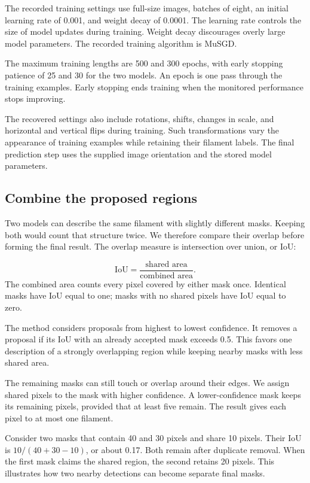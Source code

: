\documentclass[sigconf]{acmart}
\begin{document}
The recorded training settings use full-size images, batches of eight, an initial learning rate of 0.001, and weight decay of 0.0001.
The learning rate controls the size of model updates during training.
Weight decay discourages overly large model parameters. The recorded training algorithm is MuSGD.

The maximum training lengths are 500 and 300 epochs, with early stopping patience of 25 and 30 for the two models.
An epoch is one pass through the training examples. Early stopping ends training when the monitored performance stops improving.

The recovered settings also include rotations, shifts, changes in scale, and horizontal and vertical flips during training.
Such transformations vary the appearance of training examples while retaining their filament labels.
The final prediction step uses the supplied image orientation and the stored model parameters.




\subsection{Combine the proposed regions}
Two models can describe the same filament with slightly different masks. Keeping both would count that structure twice.
We therefore compare their overlap before forming the final result.
The overlap measure is intersection over union, or IoU:

\begin{equation}
\mathrm{IoU}=\frac{\text{shared area}}{\text{combined area}}.
\end{equation}
The combined area counts every pixel covered by either mask once. Identical masks have IoU equal to one; masks with no shared pixels have IoU equal to zero.

The method considers proposals from highest to lowest confidence.
It removes a proposal if its IoU with an already accepted mask exceeds 0.5.
This favors one description of a strongly overlapping region while keeping nearby masks with less shared area.


The remaining masks can still touch or overlap around their edges. We assign shared pixels to the mask with higher confidence.
A lower-confidence mask keeps its remaining pixels, provided that at least five remain.
The result gives each pixel to at most one filament.


Consider two masks that contain 40 and 30 pixels and share 10 pixels. Their IoU is $10/(40+30-10)$, or about 0.17.
Both remain after duplicate removal. When the first mask claims the shared region, the second retains 20 pixels.
This illustrates how two nearby detections can become separate final masks.
\end{document}
